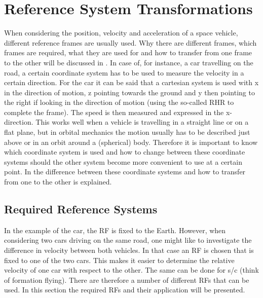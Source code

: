 \chapter{Reference System Transformations}
\label{app:appendixAA-referenceSystemTransformations}
When considering the position, velocity and acceleration of a space vehicle, different reference frames are usually used. Why there are different frames, which frames are required, what they are used for and how to transfer from one frame to the other will be discussed in . In case of, for instance, a car travelling on the road, a certain coordinate system has to be used to measure the velocity in a certain direction. For the car it can be said that a cartesian system is used with x in the direction of motion, z pointing towards the ground and y then pointing to the right if looking in the direction of motion (using the so-called \ac{RHR} to complete the frame). The speed is then measured and expressed in the x-direction. This works well when a vehicle is travelling in a straight line or on a flat plane, but in orbital mechanics the motion usually has to be described just above or in an orbit around a (spherical) body. Therefore it is important to know which coordinate system is used and how to change between these coordinate systems should the other system become more convenient to use at a certain point. In  the difference between these coordinate systems and how to transfer from one to the other is explained. 


\section{Required Reference Systems}
\label{sec:reqrefsys}
In the example of the car, the \acf{RF} is fixed to the Earth. However, when considering two cars driving on the same road, one might like to investigate the difference in velocity between both vehicles. In that case an \ac{RF} is chosen that is fixed to one of the two cars. This makes it easier to determine the relative velocity of one car with respect to the other. The same can be done for \ac{s/c} (think of formation flying). There are therefore a number of different \ac{RF}s that can be used. In this section the required \ac{RF}s and their application will be presented.



